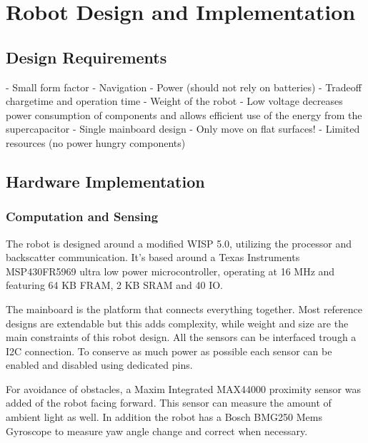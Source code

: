 \chapter{Robot Design and Implementation}


\section{Design Requirements}

- Small form factor
- Navigation
- Power (should not rely on batteries)
- Tradeoff chargetime and operation time
- Weight of the robot
- Low voltage decreases power consumption of components and allows efficient use of the energy from the supercapacitor
- Single mainboard design
- Only move on flat surfaces!
- Limited resources (no power hungry components)
	
\section{Hardware Implementation}

\subsection{Computation and Sensing}

The robot is designed around a modified WISP 5.0, utilizing the processor and backscatter communication.
It's based around a Texas Instruments MSP430FR5969 ultra low power microcontroller, operating at 16 MHz and featuring 64 KB FRAM, 2 KB SRAM and 40 IO. 


The mainboard is the platform that connects everything together.
Most reference designs are extendable but this adds complexity, while weight and size are the main constraints of this robot design.
All the sensors can be interfaced trough a I2C connection.
To conserve as much power as possible each sensor can be enabled and disabled using dedicated pins.

For avoidance of obstacles, a Maxim Integrated MAX44000 proximity sensor was added of the robot facing forward.
This sensor can measure the amount of ambient light as well.
In addition the robot has a Bosch BMG250 Mems Gyroscope to measure yaw angle change and correct when necessary.

